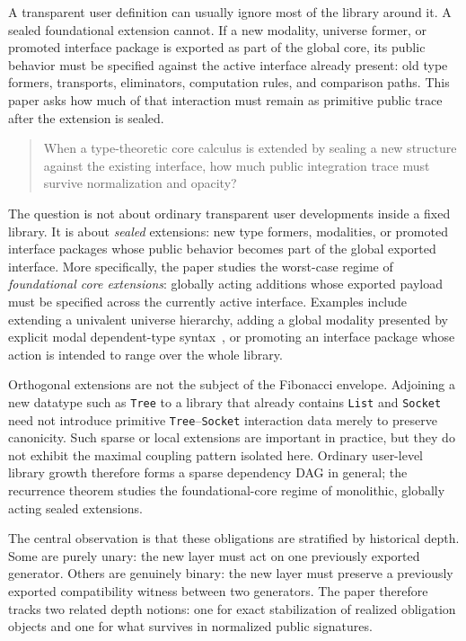 \documentclass{lmcs}
\begin{document}
A transparent user definition can usually ignore most of the library around it. A sealed foundational extension cannot. If a new modality, universe former, or promoted interface package is exported as part of the global core, its public behavior must be specified against the active interface already present: old type formers, transports, eliminators, computation rules, and comparison paths. This paper asks how much of that interaction must remain as primitive public trace after the extension is sealed.

\begin{quote}
When a type-theoretic core calculus is extended by sealing a new structure against the existing interface, how much public integration trace must survive normalization and opacity?
\end{quote}

The question is not about ordinary transparent user developments inside a fixed library. It is about \emph{sealed} extensions: new type formers, modalities, or promoted interface packages whose public behavior becomes part of the global exported interface. More specifically, the paper studies the worst-case regime of \emph{foundational core extensions}: globally acting additions whose exported payload must be specified across the currently active interface. Examples include extending a univalent universe hierarchy, adding a global modality presented by explicit modal dependent-type syntax~\cite{birkedal-modal-dtt,aagaard-cubical-mtt}, or promoting an interface package whose action is intended to range over the whole library.

Orthogonal extensions are not the subject of the Fibonacci envelope. Adjoining a new datatype such as \texttt{Tree} to a library that already contains \texttt{List} and \texttt{Socket} need not introduce primitive \texttt{Tree}--\texttt{Socket} interaction data merely to preserve canonicity. Such sparse or local extensions are important in practice, but they do not exhibit the maximal coupling pattern isolated here. Ordinary user-level library growth therefore forms a sparse dependency DAG in general; the recurrence theorem studies the foundational-core regime of monolithic, globally acting sealed extensions.

The central observation is that these obligations are stratified by historical depth. Some are purely unary: the new layer must act on one previously exported generator. Others are genuinely binary: the new layer must preserve a previously exported compatibility witness between two generators. The paper therefore tracks two related depth notions: one for exact stabilization of realized obligation objects and one for what survives in normalized public signatures.
\end{document}
